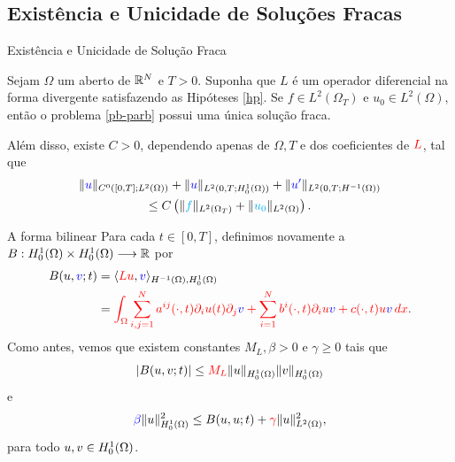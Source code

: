 \subsection*{Existência e Unicidade de Soluções Fracas}
\begin{frame}{Existência e Unicidade de Solução Fraca}
\begin{teo}
Sejam \(\Omega\) um aberto de \(\mathbb{R}^N\) e \(T>0\). Suponha que {\color{red}\(L\)} é um 
operador diferencial na forma divergente satisfazendo as Hipóteses  
{\color{blue}\eqref{hp}}. 
Se {\color{cyan}\(f\in L^2(\Omega_T)\) e \(u_0\in L^2(\Omega)\)}, então o problema 
\eqref{pb-parb} possui uma única solução fraca.

 Além disso, existe \(C>0\), dependendo apenas 
de \(\Omega, T\) e dos coeficientes de 
\({\color{red}L}\), tal que 
\begin{multline}\label{des.energia}
\lVert{\color{blue}u}\rVert_{C^0([0,T];L^2(\Omega))}+\lVert{\color{blue}u}\rVert_{L^2(0,T;H_0^1(\Omega))}
+\lVert{\color{blue}u^\prime}\rVert_{L^2(0,T;H^{-1}(\Omega))}\\
\leq C\left(\lVert{\color{cyan}f}\rVert_{L^2(\Omega_T)}+\lVert{\color{cyan}u_0}\rVert_{L^2(\Omega)}\right). 
\end{multline}
\end{teo}
\end{frame}

\begin{frame}{A forma bilinear}
Para cada \(t\in [0,T]\), definimos novamente a  
\(B:H_0^1(\Omega)\times H_0^1(\Omega) \longrightarrow \mathbb{R}\) por
\begin{align*}
B(u,{\color{blue}v};t)& =\langle{\color{red}Lu},{\color{blue}v}\rangle_{H^{-1}(\Omega),H_0^1(\Omega)}\\
& ={\color{red}\int_\Omega \sum_{i,j=1}^{N} a^{ij}(\cdot,t)\partial_iu(t)\partial_j{\color{blue}v}
+\sum_{i=1}^{N} b^i(\cdot,t)\partial_iu{\color{blue}v}+c(\cdot,t)u{\color{blue}v}\,dx}.
\end{align*}
Como antes, vemos que existem constantes {\color{blue}\(M_L,\beta>0\)} e {\color{red}\(\gamma \geq 0\)} tais que 
\[
\left|B(u,v;t)\right|\leq {\color{red}M_L}\lVert u\rVert_{H_0^1(\Omega)}\lVert v\rVert_{H_0^1(\Omega)}
\]
e
\[
{\color{blue}\beta}\lVert u\rVert_{H_0^1(\Omega)}^2\leq B(u,u;t)+{\color{red}\gamma} \lVert u\rVert_{L^2(\Omega)}^2,
\]
\quad para todo \(u,v\in H_0^1(\Omega)\).

\end{frame}
